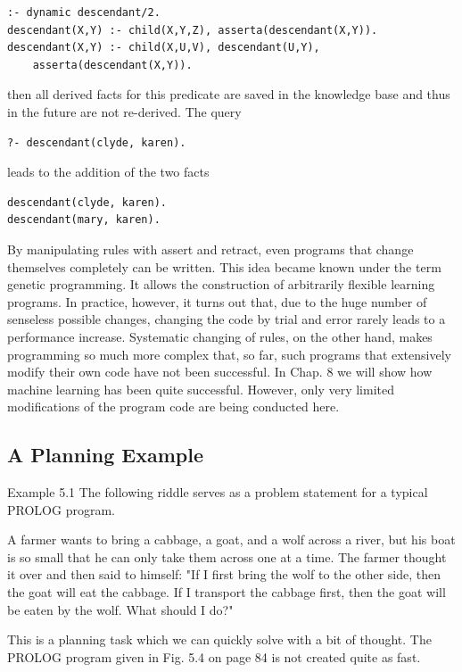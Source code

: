 \documentclass[10pt]{book}
\begin{document}
\begin{verbatim}
:- dynamic descendant/2.
descendant(X,Y) :- child(X,Y,Z), asserta(descendant(X,Y)).
descendant(X,Y) :- child(X,U,V), descendant(U,Y),
    asserta(descendant(X,Y)).
\end{verbatim}

then all derived facts for this predicate are saved in the knowledge base and thus in the future are not re-derived. The query

\begin{verbatim}
?- descendant(clyde, karen).
\end{verbatim}

leads to the addition of the two facts

\begin{verbatim}
descendant(clyde, karen).
descendant(mary, karen).
\end{verbatim}

By manipulating rules with assert and retract, even programs that change themselves completely can be written. This idea became known under the term genetic programming. It allows the construction of arbitrarily flexible learning programs. In practice, however, it turns out that, due to the huge number of senseless possible changes, changing the code by trial and error rarely leads to a performance increase. Systematic changing of rules, on the other hand, makes programming so much more complex that, so far, such programs that extensively modify their own code have not been successful. In Chap. 8 we will show how machine learning has been quite successful. However, only very limited modifications of the program code are being conducted here.

\subsection{A Planning Example}
Example 5.1 The following riddle serves as a problem statement for a typical PROLOG program.

A farmer wants to bring a cabbage, a goat, and a wolf across a river, but his boat is so small that he can only take them across one at a time. The farmer thought it over and then said to himself: "If I first bring the wolf to the other side, then the goat will eat the cabbage. If I transport the cabbage first, then the goat will be eaten by the wolf. What should I do?"

This is a planning task which we can quickly solve with a bit of thought. The PROLOG program given in Fig. 5.4 on page 84 is not created quite as fast.
\end{document}

